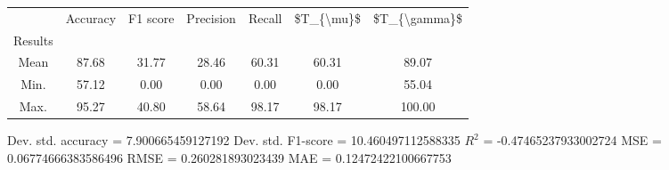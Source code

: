 \begin{tabular}{|c|c|c|c|c|c|c|}
\toprule
{} &  Accuracy &  F1 score &  Precision &  Recall &  \$T\_\{\textbackslash mu\}\$ &  \$T\_\{\textbackslash gamma\}\$ \\
Results &           &           &            &         &            &               \\
\hline
Mean    &     87.68 &     31.77 &      28.46 &   60.31 &      60.31 &         89.07 \\
Min.    &     57.12 &      0.00 &       0.00 &    0.00 &       0.00 &         55.04 \\
Max.    &     95.27 &     40.80 &      58.64 &   98.17 &      98.17 &        100.00 \\
\bottomrule
\end{tabular}

 Dev. std. accuracy = 7.900665459127192
 Dev. std. F1-score = 10.460497112588335
 $R^2$ = -0.47465237933002724
 MSE = 0.06774666383586496
 RMSE = 0.260281893023439
 MAE = 0.12472422100667753